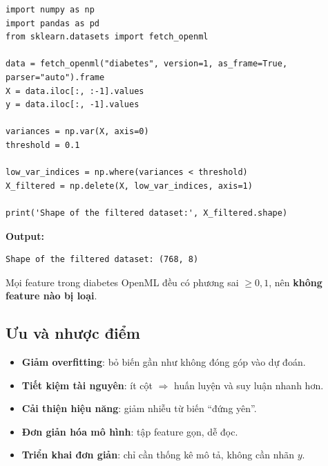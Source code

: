 \begin{vidu}[title={Mã đầy đủ}]
\begin{lstlisting}
import numpy as np
import pandas as pd
from sklearn.datasets import fetch_openml

data = fetch_openml("diabetes", version=1, as_frame=True, parser="auto").frame
X = data.iloc[:, :-1].values
y = data.iloc[:, -1].values

variances = np.var(X, axis=0)
threshold = 0.1

low_var_indices = np.where(variances < threshold)
X_filtered = np.delete(X, low_var_indices, axis=1)

print('Shape of the filtered dataset:', X_filtered.shape)
\end{lstlisting}
\end{vidu}

\begin{ynghia}[title={Kết quả đầu ra}]
\textbf{Output:}
\begin{lstlisting}
Shape of the filtered dataset: (768, 8)
\end{lstlisting}
Mọi feature trong diabetes OpenML đều có phương sai $\geq 0{,}1$, nên \textbf{không feature nào bị loại}.
\end{ynghia}

\subsection{Ưu và nhược điểm}

\begin{tinhchat}[title={Ưu điểm}]
\begin{itemize}
  \item \textbf{Giảm overfitting}: bỏ biến gần như không đóng góp vào dự đoán.
  \item \textbf{Tiết kiệm tài nguyên}: ít cột $\Rightarrow$ huấn luyện và suy luận nhanh hơn.
  \item \textbf{Cải thiện hiệu năng}: giảm nhiễu từ biến ``đứng yên''.
  \item \textbf{Đơn giản hóa mô hình}: tập feature gọn, dễ đọc.
  \item \textbf{Triển khai đơn giản}: chỉ cần thống kê mô tả, không cần nhãn $y$.
\end{itemize}
\end{tinhchat}

